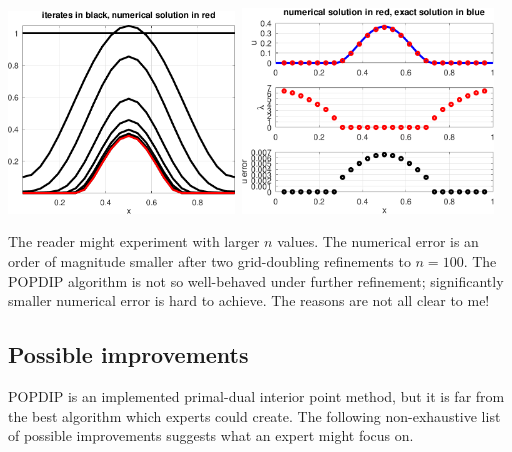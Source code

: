\documentclass[11pt]{article}
\begin{document}
\medskip
\noindent \mbox{\includegraphics[width=0.45\textwidth]{figs/iteratesobstacle.pdf} \qquad
\includegraphics[width=0.5\textwidth]{figs/errorobstacle.pdf}}

The reader might experiment with larger $n$ values.  The numerical error is an order of magnitude smaller after two grid-doubling refinements to $n=100$.  The POPDIP algorithm is not so well-behaved under further refinement; significantly smaller numerical error is hard to achieve.  The reasons are not all clear to me!




\subsection*{Possible improvements}

POPDIP is an implemented primal-dual interior point method, but it is far from the best algorithm which experts could create.  The following non-exhaustive list of possible improvements suggests what an expert might focus on.
\end{document}
